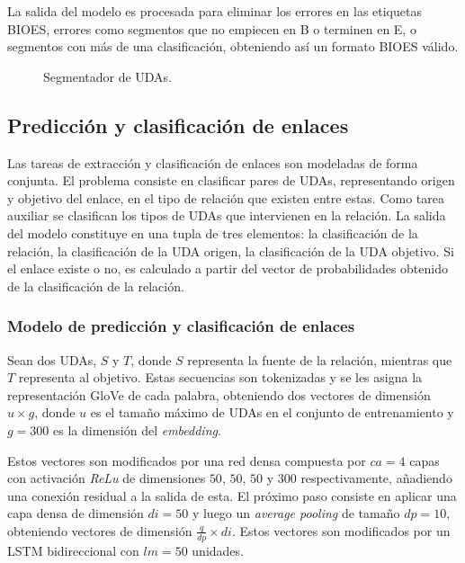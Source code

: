 \documentclass{rcci} %
\begin{document}
La salida del modelo es procesada para eliminar los errores en las etiquetas BIOES, errores como segmentos 
que no empiecen en B o terminen en E, o segmentos con m\'as de una clasificaci\'on, 
obteniendo as\'i un formato BIOES v\'alido.

\begin{figure}[!h]
	\begin{center}
		
	\end{center}
	\caption{\fontsize{11}{12}\selectfont Segmentador de UDAs.}
	\label{fig:segmenter_model}
\end{figure}

\subsection*{Predicci\'on y clasificaci\'on de enlaces}

Las tareas de extracci\'on y clasificaci\'on de enlaces son modeladas de forma conjunta.
El problema consiste en clasificar pares de UDAs, representando origen y objetivo del enlace, 
en el tipo de relaci\'on que existen entre estas.
Como tarea auxiliar se clasifican los tipos de UDAs que intervienen en la relaci\'on. La salida 
del modelo constituye en una tupla de tres elementos: la clasificaci\'on de la relaci\'on, 
la clasificaci\'on de la UDA origen, la clasificaci\'on de la UDA objetivo. Si el enlace
existe o no, es calculado a partir del vector de probabilidades obtenido de la clasificaci\'on de la relaci\'on.

\subsubsection*{Modelo de predicci\'on y clasificaci\'on de enlaces}\label{ssec:pred_clsf_enlaces}

Sean dos UDAs, $S$ y $T$, donde $S$ representa la fuente de la relaci\'on, mientras que $T$ representa
al objetivo. Estas secuencias son tokenizadas y se les asigna la representaci\'on GloVe de cada palabra, obteniendo
dos vectores de dimensi\'on $u \times g$, donde $u$ es el tama\~no m\'aximo de UDAs en el conjunto de entrenamiento
y $g=300$ es la dimensi\'on del \textit{embedding}.

Estos vectores son modificados por una red densa compuesta por $ca = 4$ capas con activaci\'on \textit{ReLu}
de dimensiones $50$, $50$, $50$ y $300$ respectivamente, a\~nadiendo una conexi\'on residual a la salida de esta. 
El pr\'oximo paso consiste en aplicar una capa densa de dimensi\'on $di=50$ y luego un \textit{average pooling}
de tama\~no $dp=10$, obteniendo vectores de dimensi\'on $\frac{q}{dp} \times di$. 
Estos vectores son modificados por un LSTM bidireccional con $lm=50$ unidades. 
\end{document}
